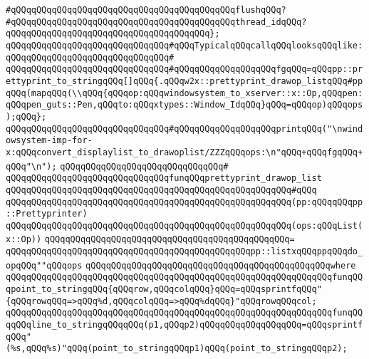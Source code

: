 \verb|#qQQqqQQqqQQqqQQqqQQqqQQqqQQqqQQqqQQqqQQqqQQqflushqQQq?|\newline
\verb|#qQQqqQQqqQQqqQQqqQQqqQQqqQQqqQQqqQQqqQQqqQQqthread_idqQQq?|\newline
\verb|qQQqqQQqqQQqqQQqqQQqqQQqqQQqqQQqqQQqqQQq};|\newline
\newline
\newline
\verb|qQQqqQQqqQQqqQQqqQQqqQQqqQQqqQQq#qQQqTypicalqQQqcallqQQqlooksqQQqlike:|\newline
\verb|qQQqqQQqqQQqqQQqqQQqqQQqqQQqqQQq#|\newline
\verb|qQQqqQQqqQQqqQQqqQQqqQQqqQQqqQQq#qQQqqQQqqQQqqQQqqQQqfgqQQq=qQQqpp::prettyprint_to_stringqQQq[]qQQq{.qQQqw2x::prettyprint_drawop_listqQQq#ppqQQq(mapqQQq(\\qQQq{qQQqop:qQQqwindowsystem_to_xserver::x::Op,qQQqpen:qQQqpen_guts::Pen,qQQqto:qQQqxtypes::Window_IdqQQq}qQQq=qQQqop)qQQqops);qQQq};|\newline
\verb|qQQqqQQqqQQqqQQqqQQqqQQqqQQqqQQq#qQQqqQQqqQQqqQQqqQQqprintqQQq("\nwindowsystem-imp-for-x:qQQqconvert_displaylist_to_drawoplist/ZZZqQQqops:\n"qQQq+qQQqfgqQQq+qQQq"\n");|\newline
\verb|qQQqqQQqqQQqqQQqqQQqqQQqqQQqqQQq#|\newline
\verb|qQQqqQQqqQQqqQQqqQQqqQQqqQQqqQQqfunqQQqprettyprint_drawop_list|\newline
\verb|qQQqqQQqqQQqqQQqqQQqqQQqqQQqqQQqqQQqqQQqqQQqqQQqqQQqqQQq#qQQq|\newline
\verb|qQQqqQQqqQQqqQQqqQQqqQQqqQQqqQQqqQQqqQQqqQQqqQQqqQQqqQQq(pp:qQQqqQQqpp::Prettyprinter)|\newline
\verb|qQQqqQQqqQQqqQQqqQQqqQQqqQQqqQQqqQQqqQQqqQQqqQQqqQQqqQQq(ops:qQQqList(x::Op))|\newline
\verb|qQQqqQQqqQQqqQQqqQQqqQQqqQQqqQQqqQQqqQQqqQQqqQQq=|\newline
\verb|qQQqqQQqqQQqqQQqqQQqqQQqqQQqqQQqqQQqqQQqqQQqqQQqpp::listxqQQqppqQQqdo_opqQQq""qQQqops|\newline
\verb|qQQqqQQqqQQqqQQqqQQqqQQqqQQqqQQqqQQqqQQqqQQqqQQqwhere|\newline
\verb|qQQqqQQqqQQqqQQqqQQqqQQqqQQqqQQqqQQqqQQqqQQqqQQqqQQqqQQqqQQqqQQqfunqQQqpoint_to_stringqQQq{qQQqrow,qQQqcolqQQq}qQQq=qQQqsprintfqQQq"{qQQqrowqQQq=>qQQq%d,qQQqcolqQQq=>qQQq%dqQQq}"qQQqrowqQQqcol;|\newline
\verb|qQQqqQQqqQQqqQQqqQQqqQQqqQQqqQQqqQQqqQQqqQQqqQQqqQQqqQQqqQQqqQQqfunqQQqqQQqline_to_stringqQQqqQQq(p1,qQQqp2)qQQqqQQqqQQqqQQqqQQq=qQQqsprintfqQQq"(%s,qQQq%s)"qQQq(point_to_stringqQQqp1)qQQq(point_to_stringqQQqp2);|\newline

